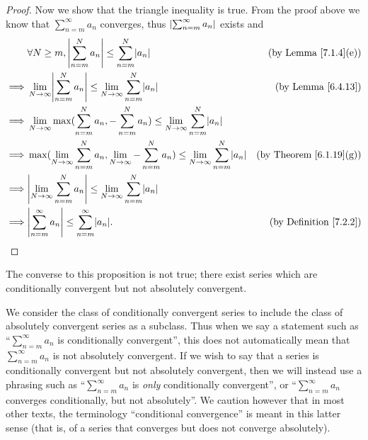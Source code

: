 \begin{proof}
    Now we show that the triangle inequality is true.
    From the proof above we know that \(\sum_{n = m}^\infty a_n\) converges, thus \(\abs*{\sum_{n = m}^\infty a_n}\) exists and
    \begin{align*}
                 & \forall N \geq m, \abs*{\sum_{n = m}^N a_n} \leq \sum_{n = m}^N \abs*{a_n}                                                               & \text{(by Lemma \ref{7.1.4}(e))}    \\
        \implies & \lim_{N \to \infty} \abs*{\sum_{n = m}^N a_n} \leq \lim_{N \to \infty} \sum_{n = m}^N \abs*{a_n}                                         & \text{(by Lemma \ref{6.4.13})}      \\
        \implies & \lim_{N \to \infty} \max(\sum_{n = m}^N a_n, -\sum_{n = m}^N a_n) \leq \lim_{N \to \infty} \sum_{n = m}^N \abs*{a_n}                                                           \\
        \implies & \max(\lim_{N \to \infty} \sum_{n = m}^N a_n, \lim_{N \to \infty} -\sum_{n = m}^N a_n) \leq \lim_{N \to \infty} \sum_{n = m}^N \abs*{a_n} & \text{(by Theorem \ref{6.1.19}(g))} \\
        \implies & \abs*{\lim_{N \to \infty} \sum_{n = m}^N a_n} \leq \lim_{N \to \infty} \sum_{n = m}^N \abs*{a_n}                                                                               \\
        \implies & \abs*{\sum_{n = m}^\infty a_n} \leq \sum_{n = m}^\infty \abs*{a_n}.                                                                      & \text{(by Definition \ref{7.2.2})}
    \end{align*}
\end{proof}

\begin{remark}\label{7.2.10}
    The converse to this proposition is not true;
    there exist series which are conditionally convergent but not absolutely convergent.
\end{remark}

\begin{remark}\label{7.2.11}
    We consider the class of conditionally convergent series to include the class of absolutely convergent series as a subclass.
    Thus when we say a statement such as ``\(\sum_{n = m}^\infty a_n\) is conditionally convergent'', this does not automatically mean that \(\sum_{n = m}^\infty a_n\) is not absolutely convergent.
    If we wish to say that a series is conditionally convergent but not absolutely convergent, then we will instead use a phrasing such as ``\(\sum_{n = m}^\infty a_n\) is \emph{only} conditionally convergent'', or ``\(\sum_{n = m}^\infty a_n\) converges conditionally, but not absolutely''.
    We caution however that in most other texts, the terminology ``conditional convergence'' is meant in this latter sense
    (that is, of a series that converges but does not converge absolutely).
\end{remark}

